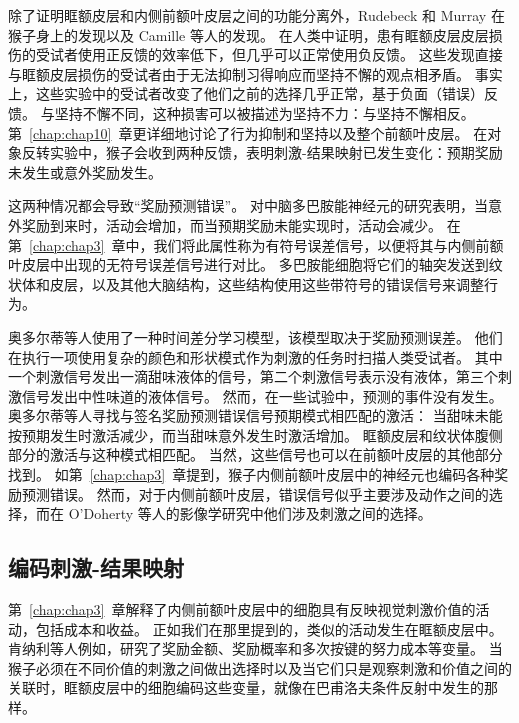 除了证明眶额皮层和内侧前额叶皮层之间的功能分离外，Rudebeck 和 Murray 在猴子身上的发现以及 Camille 等人的发现。
在人类中证明，患有眶额皮层皮层损伤的受试者使用正反馈的效率低下，但几乎可以正常使用负反馈。
这些发现直接与眶额皮层损伤的受试者由于无法抑制习得响应而坚持不懈的观点相矛盾。
事实上，这些实验中的受试者改变了他们之前的选择几乎正常，基于负面（错误）反馈。
与坚持不懈不同，这种损害可以被描述为坚持不力：与坚持不懈相反。
第~\ref{chap:chap10}~章更详细地讨论了行为抑制和坚持以及整个前额叶皮层。
在对象反转实验中，猴子会收到两种反馈，表明刺激-结果映射已发生变化：预期奖励未发生或意外奖励发生。\par
这两种情况都会导致“奖励预测错误”\cite{schultz2000neuronal}。
对中脑多巴胺能神经元的研究表明，当意外奖励到来时，活动会增加，而当预期奖励未能实现时，活动会减少\cite{schultz1998predictive}。
在第~\ref{chap:chap3}~章中，我们将此属性称为有符号误差信号，以便将其与内侧前额叶皮层中出现的无符号误差信号进行对比。
多巴胺能细胞将它们的轴突发送到纹状体和皮层，以及其他大脑结构，这些结构使用这些带符号的错误信号来调整行为。\par


奥多尔蒂等人\cite{o2003temporal}使用了一种时间差分学习模型，该模型取决于奖励预测误差。
他们在执行一项使用复杂的颜色和形状模式作为刺激的任务时扫描人类受试者。
其中一个刺激信号发出一滴甜味液体的信号，第二个刺激信号表示没有液体，第三个刺激信号发出中性味道的液体信号。
然而，在一些试验中，预测的事件没有发生。
奥多尔蒂等人寻找与签名奖励预测错误信号预期模式相匹配的激活：
当甜味未能按预期发生时激活减少，而当甜味意外发生时激活增加。
眶额皮层和纹状体腹侧部分的激活与这种模式相匹配。
当然，这些信号也可以在前额叶皮层的其他部分找到。
如第~\ref{chap:chap3}~章提到，猴子内侧前额叶皮层中的神经元也编码各种奖励预测错误\cite{matsumoto2007medial,seo2007temporal,hayden2011surprise}。
然而，对于内侧前额叶皮层，错误信号似乎主要涉及动作之间的选择，而在 O'Doherty 等人\cite{o2003temporal}的影像学研究中他们涉及刺激之间的选择。\par



\subsection{编码刺激-结果映射}

第~\ref{chap:chap3}~章解释了内侧前额叶皮层中的细胞具有反映视觉刺激价值的活动，包括成本和收益。
正如我们在那里提到的，类似的活动发生在眶额皮层中。 
肯纳利等人\cite{kennerley2009evaluating}例如，研究了奖励金额、奖励概率和多次按键的努力成本等变量。
当猴子必须在不同价值的刺激之间做出选择时\cite{seo2008cortical}以及当它们只是观察刺激和价值之间的关联时，眶额皮层中的细胞编码这些变量，就像在巴甫洛夫条件反射中发生的那样\cite{morrison2009convergence}。\par


